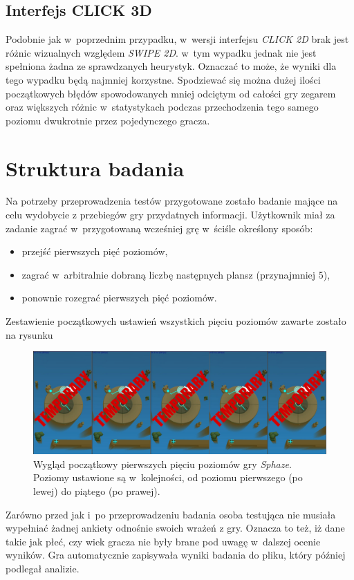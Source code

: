\documentclass[a4paper,12pt,numbers=noenddot]{report}
\begin{document}
\subsection{Interfejs CLICK 3D}
Podobnie jak w~poprzednim przypadku, w~wersji interfejsu \textit{CLICK 2D} brak jest różnic wizualnych względem \textit{SWIPE 2D}. w~tym wypadku jednak nie jest spełniona żadna ze sprawdzanych heurystyk. Oznaczać to może, że wyniki dla tego wypadku będą najmniej korzystne. Spodziewać się można dużej ilości początkowych błędów spowodowanych mniej odciętym od całości gry zegarem oraz większych różnic w~statystykach podczas przechodzenia tego samego poziomu dwukrotnie przez pojedynczego gracza.
\section{Struktura badania}
Na potrzeby przeprowadzenia testów przygotowane zostało badanie mające na celu wydobycie z przebiegów gry przydatnych informacji. 
Użytkownik miał za zadanie zagrać w~przygotowaną wcześniej grę w~ściśle określony sposób:
\begin{itemize}
\item przejść pierwszych pięć poziomów,
\item zagrać w~arbitralnie dobraną liczbę następnych plansz (przynajmniej 5),
\item ponownie rozegrać pierwszych pięć poziomów.
\end{itemize}

Zestawienie początkowych ustawień wszystkich pięciu poziomów zawarte zostało na rysunku 
\begin{figure}[h!]
	\centering
  	\includegraphics[width=\linewidth]{fig/tmp5.jpg}
	\caption{Wygląd początkowy pierwszych pięciu poziomów gry \textit{Sphaze}. Poziomy ustawione są w~kolejności, od poziomu pierwszego (po lewej) do piątego (po prawej).}
	\label{fig:all_levels}
\end{figure}
Zarówno przed jak i~po przeprowadzeniu badania osoba testująca nie musiała wypełniać żadnej ankiety odnośnie swoich wrażeń z gry. Oznacza to też, iż dane takie jak płeć, czy wiek gracza nie były brane pod uwagę w~dalszej ocenie wyników. Gra automatycznie zapisywała wyniki badania do pliku, który później podlegał analizie.
\end{document}

